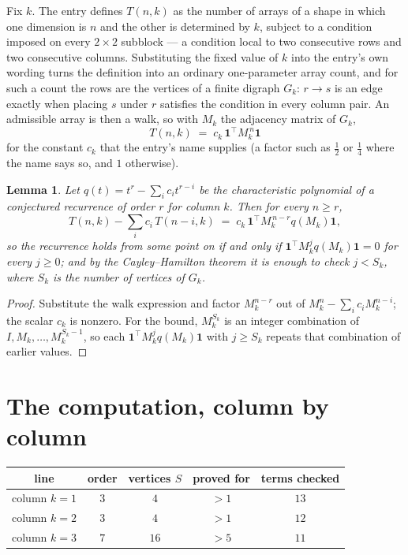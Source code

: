 \documentclass[11pt,a4paper]{article}
\theoremstyle{plain}
\newtheorem{lemma}[theorem]{Lemma}
\theoremstyle{definition}
\begin{document}
Fix $k$. The entry defines $T(n,k)$ as the number of arrays of a shape in which one dimension
is $n$ and the other is determined by $k$, subject to a condition imposed on every
$2\times2$ subblock --- a condition local to two consecutive rows and two consecutive columns.
Substituting the fixed value of $k$ into the entry's own wording turns the definition into an
ordinary one-parameter array count, and for such a count the rows are the vertices of a finite
digraph $G_k$: $r\to s$ is an edge exactly when placing $s$ under $r$ satisfies the condition
in every column pair. An admissible array is then a walk, so with $M_k$ the adjacency matrix
of $G_k$,
\[
T(n,k)\;=\;c_k\,\mathbf{1}^{\!\top}M_k^{\,n}\mathbf{1}
\]
for the constant $c_k$ that the entry's name supplies (a factor such as $\tfrac12$ or
$\tfrac14$ where the name says so, and $1$ otherwise).

\begin{lemma}\label{lem:crit}
Let $q(t)=t^{r}-\sum_i c_it^{r-i}$ be the characteristic polynomial of a conjectured
recurrence of order $r$ for column $k$. Then for every $n\ge r$,
\[
T(n,k)-\sum_i c_i\,T(n-i,k)\;=\;c_k\,\mathbf{1}^{\!\top}M_k^{\,n-r}q(M_k)\mathbf{1},
\]
so the recurrence holds from some point on if and only if
$\mathbf{1}^{\!\top}M_k^{j}q(M_k)\mathbf{1}=0$ for every $j\ge0$; and by the
Cayley--Hamilton theorem it is enough to check $j<S_k$, where $S_k$ is the number of vertices
of $G_k$.
\end{lemma}

\begin{proof}
Substitute the walk expression and factor $M_k^{n-r}$ out of $M_k^{n}-\sum_ic_iM_k^{n-i}$;
the scalar $c_k$ is nonzero. For the bound, $M_k^{S_k}$ is an integer combination of
$I,M_k,\dots,M_k^{S_k-1}$, so each $\mathbf{1}^{\!\top}M_k^{j}q(M_k)\mathbf{1}$ with
$j\ge S_k$ repeats that combination of earlier values.
\end{proof}

\section{The computation, column by column}

\begin{center}
\begin{tabular}{ccccc}
line & order & vertices $S$ & proved for & terms checked \\ \hline
column $k$$=1$ & $3$ & $4$ & $>1$ & $13$ \\
column $k$$=2$ & $3$ & $4$ & $>1$ & $12$ \\
column $k$$=3$ & $7$ & $16$ & $>5$ & $11$ \\
\end{tabular}
\end{center}
\end{document}
